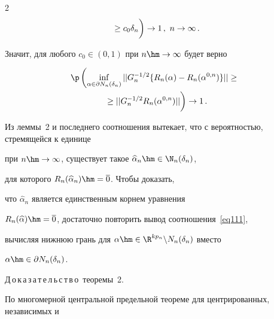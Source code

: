 \begin{multicols}{2}
\begin{multline}
\left.{}\geq c_0\delta_n \vphantom{\inf\limits_{\alpha\in\partial N_n(\delta_n)}}


\right)\rightarrow 1\,,\ n\rightarrow\infty\,.


\label{eq111}


\end{multline}


Значит, для любого $c_0\in(0,1)$ при $n\hm\rightarrow\infty$ будет верно


\begin{multline*}


\p\left(\inf\limits_{\alpha\in\partial N_n(\delta_n)}||G_n^{-1/2}\{R_n(\alpha)-


R_n(\alpha^{0,n})\}||\geq{}\right.\\


\left.{}\geq ||G_n^{-1/2}R_n(\alpha^{0,n})||


\vphantom{\inf\limits_{\alpha\in\partial N_n(\delta_n)}}


\right)\rightarrow1\,.




\end{multline*}





Из леммы~2 и последнего соотношения вытекает, что с вероятностью, стремящейся к единице 


при $n\hm\rightarrow\infty$, существует такое $\widehat{\alpha}_n\hm\in\N_n(\delta_n)$, 


для которого $R_n(\widehat{\alpha}_n)\hm=\overline{0}$. Чтобы доказать, 


что $\widehat{\alpha}_n$ является единственным корнем уравнения 


$R_n(\widehat{\alpha})\hm=\overline{0}$, достаточно повторить вывод соотношения~\eqref{eq111}, 


вычисляя нижнюю грань для $\alpha\hm\in\R^{kp_n}\backslash N_n(\delta_n)$ вместо 


$\alpha\hm\in\partial N_n(\delta_n)$.








\medskip





\noindent


Д\,о\,к\,а\,з\,а\,т\,е\,л\,ь\,с\,т\,в\,о\ теоремы~2.


По многомерной центральной предельной теореме для центрированных, независимых и 



\end{multicols}
